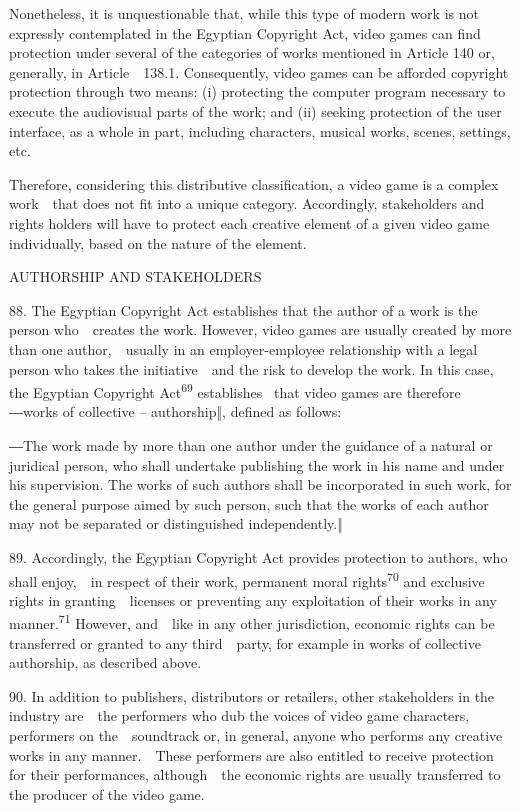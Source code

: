 \documentclass[
]{article}
\begin{document}
{Nonetheless, it is unquestionable that, while this type of modern work
is not expressly contemplated in the Egyptian }{Copyright Act}{, video
games can find protection under several of the categories of works
mentioned in Article 140 or, generally, in Article~~138.1. Consequently,
video games can be afforded copyright protection through two means: (i)
protecting the computer program necessary to execute the audiovisual
parts of the work; and (ii) seeking protection of the user interface, as
a whole in part, including characters, musical works, scenes, settings,
etc.}

{Therefore, considering this distributive classification, a video game
is a complex work~~that does not fit into a unique category.
Accordingly, stakeholders and rights holders will have to protect each
creative element of a given video game individually, based on the nature
of the element.}

{AUTHORSHIP AND STAKEHOLDERS}

{88. }{The Egyptian }{Copyright Act }{establishes that the author of a
work is the }{person who~~creates the work. }{However, video games are
usually created by more than one author,~~usually in an
employer-employee relationship with a legal person who takes the
initiative~~and the risk to develop the work. In this case, the Egyptian
}{Copyright Act}\textsuperscript{{69 }}{establishes }{~that video games
are therefore ―works of collective -- authorship‖, defined as follows:}

{―The work made by more than one author under the guidance of a natural
or }{juridical person, who shall undertake publishing the work in his
name and under his supervision. The works of such authors shall be
incorporated in such work, for the general purpose aimed by such person,
such that the works }{of each author may not be separated or
distinguished independently.‖}

{89. }{Accordingly, the Egyptian }{Copyright Act }{provides protection
to authors, who shall enjoy,~~in respect of their work, permanent moral
rights}\textsuperscript{{70 }}{and exclusive rights in
granting~~licenses or preventing any exploitation of their works in any
manner.}\textsuperscript{{71 }}{However, and~~like in any other
jurisdiction, economic rights can be transferred or granted to any
third~~party, for example in works of collective authorship, as
described above.}

{90. }{In addition to publishers, distributors or retailers, other
stakeholders in the industry are~~the performers who dub the voices of
video game characters, performers on the~~soundtrack or, in general,
anyone who performs any creative works in any manner.~~These performers
are also entitled to receive protection for their performances,
although~~the economic rights are usually transferred to the producer of
the video game.}
\end{document}
